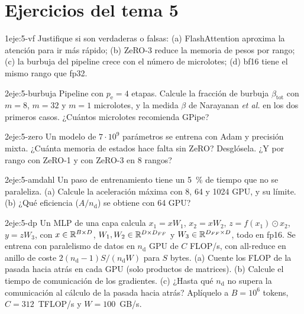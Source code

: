 \section*{Ejercicios del tema 5}

\begin{ejercicio}{1}{eje:5-vf}
Justifique si son verdaderas o falsas: (a) FlashAttention aproxima la atención para ir más rápido; (b) ZeRO-3 reduce la memoria de pesos por rango; (c) la burbuja del pipeline crece con el número de microlotes; (d) bf16 tiene el mismo rango que fp32.
\end{ejercicio}

\begin{ejercicio}{2}{eje:5-burbuja}
Pipeline con $p_{\mathrm{e}}=4$ etapas. Calcule la fracción de burbuja $\beta_{\mathrm{tot}}$ con $m=8$, $m=32$ y $m=1$ microlotes, y la medida $\beta$ de Narayanan \emph{et al.} en los dos primeros casos. ¿Cuántos microlotes recomienda GPipe?
\end{ejercicio}

\begin{ejercicio}{2}{eje:5-zero}
Un modelo de $7\cdot 10^{9}$ parámetros se entrena con Adam y precisión mixta. ¿Cuánta memoria de estados hace falta sin ZeRO? Desglósela. ¿Y por rango con ZeRO-1 y con ZeRO-3 en 8 rangos?
\end{ejercicio}

\begin{ejercicio}{2}{eje:5-amdahl}
Un paso de entrenamiento tiene un 5~\% de tiempo que no se paraleliza. (a) Calcule la aceleración máxima con 8, 64 y 1024 GPU, y su límite. (b) ¿Qué eficiencia ($A/n_{\mathrm{d}}$) se obtiene con 64 GPU?
\end{ejercicio}

\begin{ejercicio}{2}{eje:5-dp}
Un MLP de una capa calcula $x_1=xW_1$, $x_2=xW_2$, $z=f(x_1)\odot x_2$, $y=zW_3$, con $x\in\mathbb{R}^{B\times D}$, $W_1,W_2\in\mathbb{R}^{D\times D_{FF}}$ y $W_3\in\mathbb{R}^{D_{FF}\times D}$, todo en fp16. Se entrena con paralelismo de datos en $n_{\mathrm{d}}$ GPU de $C$ FLOP/s, con all-reduce en anillo de coste $2(n_{\mathrm{d}}-1)S/(n_{\mathrm{d}}W)$ para $S$ bytes. (a) Cuente los FLOP de la pasada hacia atrás en cada GPU (solo productos de matrices). (b) Calcule el tiempo de comunicación de los gradientes. (c) ¿Hasta qué $n_{\mathrm{d}}$ no supera la comunicación al cálculo de la pasada hacia atrás? Aplíquelo a $B=10^{6}$ tokens, $C=312$~TFLOP/s y $W=100$~GB/s.
\end{ejercicio}

